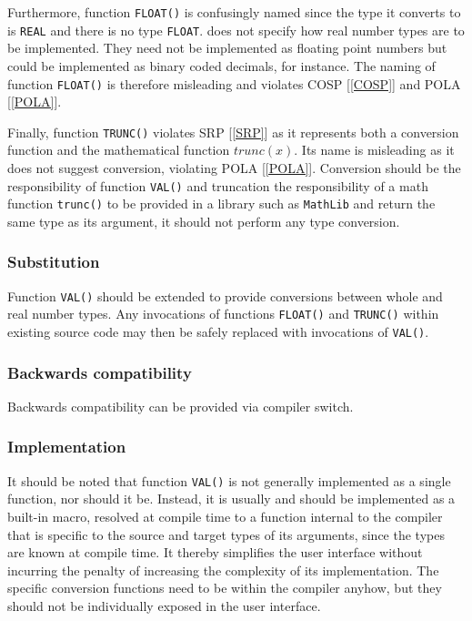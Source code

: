 \documentclass[10pt,a4paper]{article}
\begin{document}
Furthermore, function \verb|FLOAT()| is confusingly named since the type it
converts to is \verb|REAL| and there is no type \verb|FLOAT|. \cite{Wirth88}
does not specify how real number types are to be implemented. They need not be
implemented as floating point numbers but could be implemented as binary coded
decimals, for instance. The naming of function \verb|FLOAT()| is therefore
misleading and violates COSP [\ref{COSP}] and POLA [\ref{POLA}].

Finally, function \verb|TRUNC()| violates SRP [\ref{SRP}] as it represents
both a conversion function and the mathematical function $trunc(x)$.
Its name is misleading as it does not suggest conversion, violating
POLA [\ref{POLA}]. Conversion should be the responsibility of function
\verb|VAL()| and truncation the responsibility of a math function
\verb|trunc()| to be provided in a library such as \verb|MathLib| and
return the same type as its argument, it should not perform any type
conversion.

\subsubsection{Substitution}

Function \verb|VAL()| should be extended to provide conversions between whole
and real number types. Any invocations of functions \verb|FLOAT()| and
\verb|TRUNC()| within existing source code may then be safely replaced
with invocations of \verb|VAL()|.

\subsubsection{Backwards compatibility}

Backwards compatibility can be provided via compiler switch.

\subsubsection{Implementation}
It should be noted that function \verb|VAL()| is not generally implemented as a
single function, nor should it be. Instead, it is usually and should be
implemented as a built-in macro, resolved at compile time to a function
internal to the compiler that is specific to the source and target types of its
arguments, since the types are known at compile time. It thereby simplifies the
user interface without incurring the penalty of increasing the complexity of
its implementation. The specific conversion functions need to be within the
compiler anyhow, but they should not be individually exposed in the user
interface.
\end{document}
